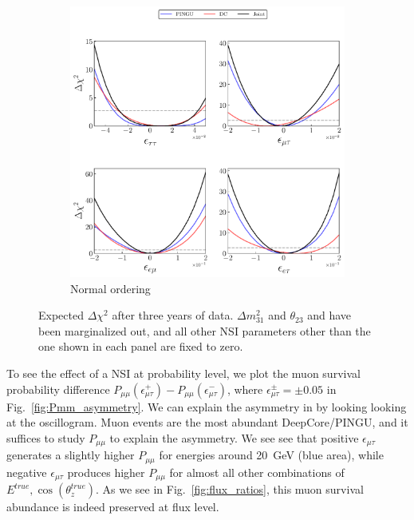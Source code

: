 \documentclass[draft=True]{revtex4-2}
\newcommand{\ztrue}{\ensuremath{\cos{(\theta_z^{true})}}}
\newcommand{\emt}{\ensuremath{\epsilon_{\mu\tau}}}
\newcommand{\Etrue}{E^{true}}
\newcommand{\dm}{\Delta m^2_{31}}
\begin{document}
{\begin{figure}[!tb]
   \begin{center}
      \begin{subfigure}{0.45\textwidth}
         \includegraphics[width=1\linewidth]{figures/joint_3D_NO.pdf}
         \caption{Normal ordering}\label{fig:joint_3D}
      \end{subfigure}
    \end{center}
    \caption{Expected $\Delta \chi^2$ after three years of data.
    $\dm$ and $\theta_{23}$ and have been marginalized out, and all other NSI 
    parameters other than the one shown in each panel are fixed to zero.}\label{fig:3D_NO}
 \end{figure}


To see the effect of a NSI at probability level, we plot the muon survival probability difference $P_{\mu\mu}(\epsilon^+_{\mu\tau}) - P_{\mu\mu}(\epsilon^-_{\mu\tau})$, where 
$\epsilon^\pm_{\mu\tau} = \pm 0.05$ in Fig.~\ref{fig:Pmm_asymmetry}. We can explain the asymmetry in  by looking looking at the oscillogram. Muon events are the most abundant DeepCore/PINGU, and it suffices to study $P_{\mu\mu}$ to explain the asymmetry. 
We see see that positive $\emt$ generates a slightly higher $P_{\mu\mu}$ for energies around \SI{20}{\GeV} (blue area),
while negative $\emt$ produces higher $P_{\mu\mu}$ for almost all other combinations of ${\Etrue,\ztrue}$. As we see in Fig.~\ref{fig:flux_ratios}, this muon survival abundance 
is indeed preserved at flux level.

}
\end{document}
